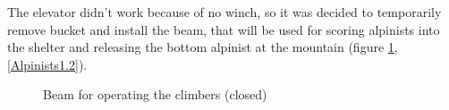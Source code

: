 The elevator didn't work because of no winch, so it was decided to temporarily remove bucket and install the beam, that will be used for scoring alpinists into the shelter and releasing the bottom alpinist at the mountain (figure \ref{Alpinists1.1}, \ref{Alpinists1.2}).

\begin{figure}[H]
	\begin{minipage}[h]{0.47\linewidth}
		\caption{Beam for operating the climbers (closed)}
		\label{Alpinists1.1}
	\end{minipage}
	\hfill
	\begin{minipage}[h]{0.47\linewidth}

\end{minipage}
\end{figure}

